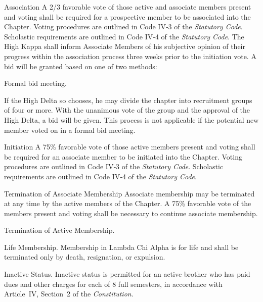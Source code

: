 \documentclass{article}
\begin{document}
\begin{subsubsectionList}
  \item {\titleStyle Association\titleSuffix}
  A 2/3 favorable vote of those active and associate members present and voting
  shall be required for a prospective member to be associated into the Chapter.
  Voting procedures are outlined in Code IV‑3 of the \emph{Statutory Code}.
  Scholastic requirements are outlined in Code IV‑4 of the \emph{Statutory
  Code}. The High Kappa shall inform Associate Members of his subjective opinion
  of their progress within the association process three weeks prior to the
  initiation vote. A bid will be granted based on one of two methods:

  \begin{orderedList}
    \item Formal bid meeting.

    \item If the High Delta so chooses, he may divide the chapter into
    recruitment groups of four or more. With the unanimous vote of the group and
    the approval of the High Delta, a bid will be given. This process is not
    applicable if the potential new member voted on in a formal bid meeting.
  \end{orderedList}

  \item {\titleStyle Initiation\titleSuffix}
  A 75\% favorable vote of those active members present and voting shall be
  required for an associate member to be initiated into the Chapter. Voting
  procedures are outlined in Code IV‑3 of the \emph{Statutory Code}. Scholastic
  requirements are outlined in Code IV‑4 of the \emph{Statutory Code}.

  \item {\titleStyle Termination of Associate Membership\titleSuffix}
  Associate membership may be terminated at any time by the active members of
  the Chapter. A 75\% favorable vote of the members present and voting shall be
  necessary to continue associate membership.

  \item {\titleStyle Termination of Active Membership.}
  \begin{orderedList}
    \item {\titleStyle Life Membership}. Membership in Lambda Chi Alpha is for
    life and shall be terminated only by death, resignation, or expulsion.

    \item {\titleStyle Inactive Status}. Inactive status is permitted for an
    active brother who has paid dues and other charges for each of 8 full
    semesters, in accordance with Article~IV, Section~2 of the
    \emph{Constitution}.


\end{orderedList}
\end{subsubsectionList}
\end{document}
